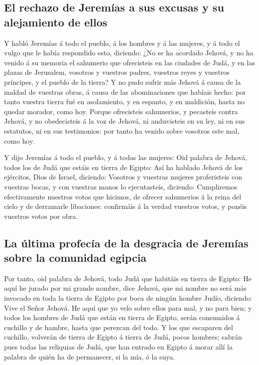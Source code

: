 \hypertarget{el-rechazo-de-jeremuxedas-a-sus-excusas-y-su-alejamiento-de-ellos}{%
\subsection{El rechazo de Jeremías a sus excusas y su alejamiento de
ellos}\label{el-rechazo-de-jeremuxedas-a-sus-excusas-y-su-alejamiento-de-ellos}}

 Y habló Jeremías á todo el pueblo, á los hombres y á las
mujeres, y á todo el vulgo que le había respondido esto, diciendo:
 ¿No se ha acordado Jehová, y no ha venido á su memoria
el sahumerio que ofrecisteis en las ciudades de Judá, y en las plazas de
Jerusalem, vosotros y vuestros padres, vuestros reyes y vuestros
príncipes, y el pueblo de la tierra?  Y no pudo sufrir
más Jehová á causa de la maldad de vuestras obras, á causa de las
abominaciones que habíais hecho: por tanto vuestra tierra fué en
asolamiento, y en espanto, y en maldición, hasta no quedar morador, como
hoy.  Porque ofrecisteis sahumerios, y pecasteis contra
Jehová, y no obedecisteis á la voz de Jehová, ni anduvisteis en su ley,
ni en sus estatutos, ni en sus testimonios: por tanto ha venido sobre
vosotros este mal, como hoy.

 Y dijo Jeremías á todo el pueblo, y á todas las mujeres:
Oid palabra de Jehová, todos los de Judá que estáis en tierra de Egipto:
 Así ha hablado Jehová de los ejércitos, Dios de Israel,
diciendo: Vosotros y vuestras mujeres proferisteis con vuestras bocas, y
con vuestras manos lo ejecutasteis, diciendo: Cumpliremos efectivamente
nuestros votos que hicimos, de ofrecer sahumerios á la reina del cielo y
de derramarle libaciones: confirmáis á la verdad vuestros votos, y
ponéis vuestros votos por obra.

\hypertarget{la-uxfaltima-profecuxeda-de-la-desgracia-de-jeremuxedas-sobre-la-comunidad-egipcia}{%
\subsection{La última profecía de la desgracia de Jeremías sobre la
comunidad
egipcia}\label{la-uxfaltima-profecuxeda-de-la-desgracia-de-jeremuxedas-sobre-la-comunidad-egipcia}}

 Por tanto, oid palabra de Jehová, todo Judá que habitáis
en tierra de Egipto: He aquí he jurado por mi grande nombre, dice
Jehová, que mi nombre no será más invocado en toda la tierra de Egipto
por boca de ningún hombre Judío, diciendo: Vive el Señor Jehová.
 He aquí que yo velo sobre ellos para mal, y no para
bien; y todos los hombres de Judá que están en tierra de Egipto, serán
consumidos á cuchillo y de hambre, hasta que perezcan del todo.
 Y los que escaparen del cuchillo, volverán de tierra de
Egipto á tierra de Judá, pocos hombres; sabrán pues todas las reliquias
de Judá, que han entrado en Egipto á morar allí la palabra de quién ha
de permanecer, si la mía, ó la suya.

